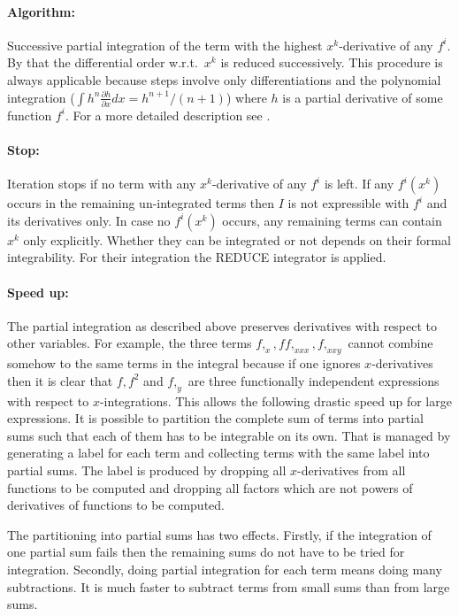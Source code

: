 \paragraph*{Algorithm:}

Successive partial integration of the term with the highest
$x^k$-derivative of any $f^i$.  By that the differential order
w.r.t.\ $x^k$ is reduced successively.  This procedure is always
applicable because steps involve only differentiations and the
polynomial integration ($\int h^n\frac{\partial h}{\partial x}dx =
h^{n+1}/(n+1)$) where $h$ is a partial derivative of some function
$f^i$.  For a more detailed description see \cite{Wolf:2000}.

\paragraph*{Stop:}

Iteration stops if no term with any $x^k$-derivative of any $f^i$ is
left.  If any $f^i(x^k)$ occurs in the remaining un-integrated terms
then $I$ is not expressible with $f^i$ and its derivatives only.  In
case no $f^i(x^k)$ occurs, any remaining terms can contain $x^k$ only
explicitly.  Whether they can be integrated or not depends on their
formal integrability.  For their integration the REDUCE integrator is
applied.

\paragraph*{Speed up:}

The partial integration as described above preserves derivatives with
respect to other variables.  For example, the three terms $f,_x, f
f,_{xxx}, f,_{xxy}$ cannot combine somehow to the same terms in the
integral because if one ignores $x$-derivatives then it is clear that
$f, f^2$ and $f,_y$ are three functionally independent expressions
with respect to $x$-integrations.  This allows the following drastic
speed up for large expressions.  It is possible to partition the
complete sum of terms into partial sums such that each of them has to
be integrable on its own.  That is managed by generating a label for
each term and collecting terms with the same label into partial sums.
The label is produced by dropping all $x$-derivatives from all
functions to be computed and dropping all factors which are not powers
of derivatives of functions to be computed.

The partitioning into partial sums has two effects.  Firstly, if the
integration of one partial sum fails then the remaining sums do not
have to be tried for integration.  Secondly, doing partial integration
for each term means doing many subtractions.  It is much faster to
subtract terms from small sums than from large sums.

